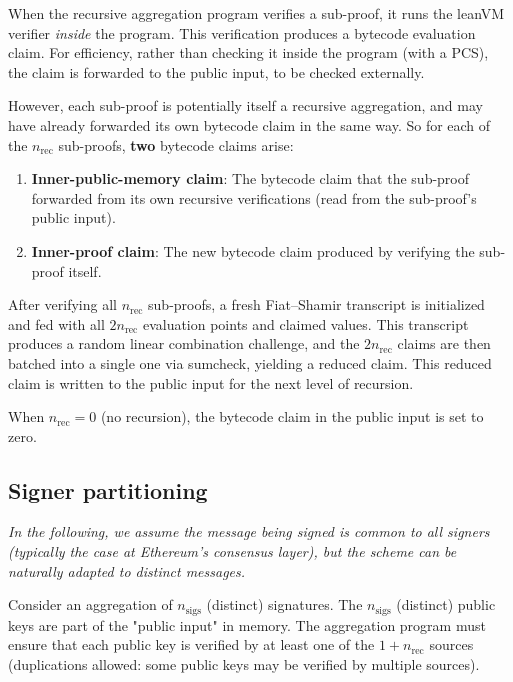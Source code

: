 \documentclass{article}
\theoremstyle{definition}
\begin{document}
When the recursive aggregation program verifies a sub-proof, it runs the leanVM verifier \emph{inside} the program. This verification produces a bytecode evaluation claim. For efficiency, rather than checking it inside the program (with a PCS), the claim is forwarded to the public input, to be checked externally.

However, each sub-proof is potentially itself a recursive aggregation, and may have already forwarded its own bytecode claim in the same way. So for each of the $n_{\text{rec}}$ sub-proofs, \textbf{two} bytecode claims arise:

\begin{enumerate}
    \item \textbf{Inner-public-memory claim}: The bytecode claim that the sub-proof forwarded from its own recursive verifications (read from the sub-proof's public input).

    \item \textbf{Inner-proof claim}: The new bytecode claim produced by verifying the sub-proof itself.
\end{enumerate}

After verifying all $n_{\text{rec}}$ sub-proofs, a fresh Fiat--Shamir transcript is initialized and fed with all $2 n_{\text{rec}}$ evaluation points and claimed values. This transcript produces a random linear combination challenge, and the $2 n_{\text{rec}}$ claims are then batched into a single one via sumcheck, yielding a reduced claim. This reduced claim is written to the public input for the next level of recursion.

When $n_{\text{rec}} = 0$ (no recursion), the bytecode claim in the public input is set to zero.


\subsection{Signer partitioning}\label{sec:signer-partitioning}

\emph{
In the following, we assume  the message being signed is common to all signers (typically the case at Ethereum's consensus layer), but the scheme can be naturally adapted to distinct messages.}

\vspace{3mm}

Consider an aggregation of $n_{\text{sigs}}$ (distinct) signatures. The $n_{\text{sigs}}$ (distinct) public keys are part of the "public input" in memory. The aggregation program must ensure that each public key is verified by at least one of the $1 + n_{\text{rec}}$ sources (duplications allowed: some public keys may be verified by multiple sources).
\end{document}
